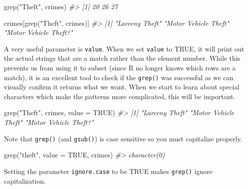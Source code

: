 \documentclass[
  12pt,
]{book}
\newenvironment{Shaded}{\begin{snugshade}}{\end{snugshade}}
\newcommand{\AttributeTok}[1]{\textcolor[rgb]{0.61,0.61,0.61}{#1}}
\newcommand{\CommentTok}[1]{\textcolor[rgb]{0.37,0.37,0.37}{\textit{#1}}}
\newcommand{\ConstantTok}[1]{\textcolor[rgb]{0,0,0}{#1}}
\newcommand{\FunctionTok}[1]{\textcolor[rgb]{0,0,0}{#1}}
\newcommand{\NormalTok}[1]{#1}
\newcommand{\StringTok}[1]{\textcolor[rgb]{0.5,0.5,0.5}{#1}}
\begin{document}
\begin{Shaded}
\begin{Highlighting}[]
\FunctionTok{grep}\NormalTok{(}\StringTok{"Theft"}\NormalTok{, crimes)}
\CommentTok{\#\textgreater{} [1] 20 26 27}
\end{Highlighting}
\end{Shaded}

\begin{Shaded}
\begin{Highlighting}[]
\NormalTok{crimes[}\FunctionTok{grep}\NormalTok{(}\StringTok{"Theft"}\NormalTok{, crimes)]}
\CommentTok{\#\textgreater{} [1] "Larceny Theft"        "Motor Vehicle Theft"  "Motor Vehicle Theft?"}
\end{Highlighting}
\end{Shaded}

A very useful parameter is \texttt{value}. When we set \texttt{value} to TRUE, it will print out the actual strings that are a match rather than the element number. While this prevents us from using it to subset (since R no longer knows which rows are a match), it is an excellent tool to check if the \texttt{grep()} was successful as we can visually confirm it returns what we want. When we start to learn about special characters which make the patterns more complicated, this will be important.

\begin{Shaded}
\begin{Highlighting}[]
\FunctionTok{grep}\NormalTok{(}\StringTok{"Theft"}\NormalTok{, crimes, }\AttributeTok{value =} \ConstantTok{TRUE}\NormalTok{)}
\CommentTok{\#\textgreater{} [1] "Larceny Theft"        "Motor Vehicle Theft"  "Motor Vehicle Theft?"}
\end{Highlighting}
\end{Shaded}

Note that \texttt{grep()} (and \texttt{gsub()}) is case sensitive so you must capitalize properly.

\begin{Shaded}
\begin{Highlighting}[]
\FunctionTok{grep}\NormalTok{(}\StringTok{"theft"}\NormalTok{, }\AttributeTok{value =} \ConstantTok{TRUE}\NormalTok{, crimes)}
\CommentTok{\#\textgreater{} character(0)}
\end{Highlighting}
\end{Shaded}

Setting the parameter \texttt{ignore.case} to be TRUE makes \texttt{grep()} ignore capitalization.
\end{document}
